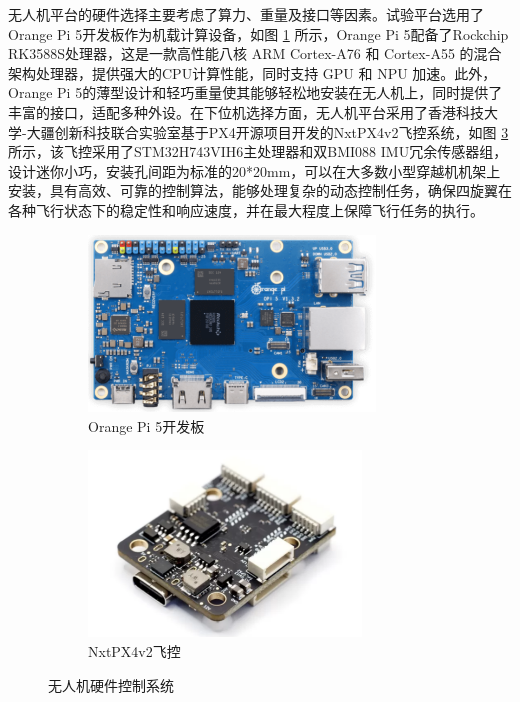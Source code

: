 \documentclass[lang=chs, degree=master, blindreview=false, winfonts=true]{yanputhesis}
\begin{document}
无人机平台的硬件选择主要考虑了算力、重量及接口等因素。试验平台选用了Orange Pi 5开发板作为机载计算设备，如图 \ref{fig.fmtpath} 所示，Orange Pi 5配备了Rockchip RK3588S处理器，这是一款高性能八核 ARM Cortex-A76 和 Cortex-A55 的混合架构处理器，提供强大的CPU计算性能，同时支持 GPU 和 NPU 加速。此外，Orange Pi 5的薄型设计和轻巧重量使其能够轻松地安装在无人机上，同时提供了丰富的接口，适配多种外设。在下位机选择方面，无人机平台采用了香港科技大学-大疆创新科技联合实验室基于PX4开源项目开发的NxtPX4v2飞控系统，如图 \ref{fig.proximity-tra} 所示，该飞控采用了STM32H743VIH6主处理器和双BMI088 IMU冗余传感器组，设计迷你小巧，安装孔间距为标准的20*20mm，可以在大多数小型穿越机机架上安装，具有高效、可靠的控制算法，能够处理复杂的动态控制任务，确保四旋翼在各种飞行状态下的稳定性和响应速度，并在最大程度上保障飞行任务的执行。

\begin{figure}[htb!]
    \centering
    \begin{minipage}[t]{0.96\textwidth}
        \centering
        \begin{subfigure}[t]{0.47\textwidth}
            \centering
            \includegraphics[height = 1.85in]{picture/5_5.png}
            \caption{Orange Pi 5开发板\label{fig.fmtpath}}
        \end{subfigure}\hfill
        \begin{subfigure}[t]{0.47\textwidth}
            \centering
            \includegraphics[height = 1.95in]{picture/5_6.png}
            \caption{NxtPX4v2飞控\label{fig.proximity-tra}}
        \end{subfigure}
    \end{minipage}
    \caption{无人机硬件控制系统}
\end{figure}
\end{document}
